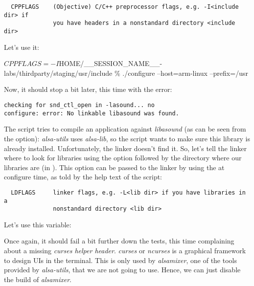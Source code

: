 \begin{verbatim}
  CPPFLAGS    (Objective) C/C++ preprocessor flags, e.g. -I<include dir> if
              you have headers in a nonstandard directory <include dir>
\end{verbatim}

Let's use it:

\begin{bashinput}
$ CPPFLAGS=-I$HOME/__SESSION_NAME__-labs/thirdparty/staging/usr/include \%\linebreak
./configure --host=arm-linux --prefix=/usr
\end{bashinput}

Now, it should stop a bit later, this time with the error:
\begin{verbatim}
checking for snd_ctl_open in -lasound... no
configure: error: No linkable libasound was found.
\end{verbatim}

The  script tries to compile an application against {\em
  libasound} (as can be seen from the  option): {\em
  alsa-utils} uses {\em alsa-lib}, so the  script
wants to make sure this library is already installed. Unfortunately,
the  linker doesn't find it. So, let's tell the
linker where to look for libraries using the  option followed
by the directory where our libraries are (in
). This  option can be passed to the
linker by using the  at configure time, as told by the
help text of the  script:

\begin{verbatim}
  LDFLAGS     linker flags, e.g. -L<lib dir> if you have libraries in a
              nonstandard directory <lib dir>
\end{verbatim}

Let's use this  variable:


Once again, it should fail a bit further down the tests, this time
complaining about a missing {\em curses helper header}. {\em curses}
or {\em ncurses} is a graphical framework to design UIs in the
terminal. This is only used by {\em alsamixer}, one of the tools
provided by {\em alsa-utils}, that we are not going to use.
Hence, we can just disable the build of {\em alsamixer}.

